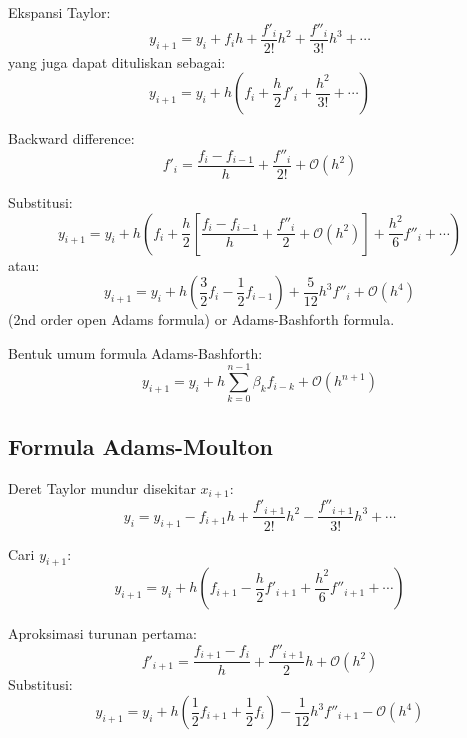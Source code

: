 Ekspansi Taylor:
\begin{equation*}
y_{i+1} = y_{i} + f_{i} h + \frac{f'_{i}}{2!} h^2 + \frac{f''_{i}}{3!} h^3 + \cdots
\end{equation*}
yang juga dapat dituliskan sebagai:
\begin{equation*}
y_{i+1} = y_{i} + h\left( f_i + \frac{h}{2}f'_{i} + \frac{h^2}{3!} + \cdots \right)
\end{equation*}

Backward difference:
\begin{equation*}
f'_{i} = \frac{f_i - f_{i-1}}{h} + \frac{f''_{i}}{2!} + \mathcal{O}(h^2)
\end{equation*}

Substitusi:
\begin{equation*}
y_{i+1} = y_{i} + h \left(
f_{i} + \frac{h}{2} \left[ \frac{f_i - f_{i-1}}{h} + \frac{f''_{i}}{2} + \mathcal{O}(h^2) \right]
+ \frac{h^2}{6} f''_{i} + \cdots \right)
\end{equation*}
atau:
\begin{equation*}
y_{i+1} = y_{i} + h \left( \frac{3}{2} f_{i} - \frac{1}{2} f_{i-1} \right) +
\frac{5}{12} h^3 f''_{i} + \mathcal{O}(h^4)
\end{equation*}
(2nd order open Adams formula)
or Adams-Bashforth formula.

Bentuk umum formula Adams-Bashforth:
\begin{equation*}
y_{i+1} = y_{i} + h \sum_{k=0}^{n-1} \beta_{k} f_{i-k} + \mathcal{O}(h^{n+1})
\end{equation*}



\subsection*{Formula Adams-Moulton}

Deret Taylor mundur disekitar $x_{i+1}$:
\begin{equation*}
y_{i} = y_{i+1} - f_{i+1}h + \frac{f'_{i+1}}{2!} h^2 - \frac{f''_{i+1}}{3!} h^3 + \cdots
\end{equation*}

Cari $y_{i+1}$:
\begin{equation*}
y_{i+1} = y_i + h \left( f_{i+1} - \frac{h}{2}f'_{i+1} + \frac{h^2}{6} f''_{i+1} + \cdots \right)
\end{equation*}

Aproksimasi turunan pertama:
\begin{equation*}
f'_{i+1} = \frac{f_{i+1} - f_{i}}{h} + \frac{f''_{i+1}}{2}h + \mathcal{O}(h^2)
\end{equation*}
Substitusi:
\begin{equation*}
y_{i+1} = y_{i} + h \left( \frac{1}{2}f_{i+1} + \frac{1}{2}f_{i} \right) - 
\frac{1}{12} h^3 f''_{i+1} - \mathcal{O}(h^4)
\end{equation*}

